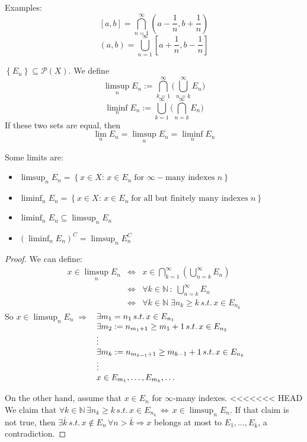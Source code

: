 Examples:
\[
    [a,b] = \bigcap_{n = 1}^{\infty} (a - \frac{1}{n}, b + \frac{1}{n}) 
\]
\[
    (a,b) = \bigcup_{n = 1}^{\infty}[a + \frac{1}{n}, b - \frac{1}{n}]
\]
\begin{definition}
    \(\left\lbrace E_n \right\rbrace \subseteq \mathcal{P}(X)\). We define 
    \[
        \limsup_{n} E_n := \bigcap_{k = 1}^{\infty} \bigl(\bigcup_{n = k}^{\infty} E_n\bigr)
    \]
    \[
        \liminf_{n} E_n := \bigcup_{k = 1}^{\infty} \bigl(\bigcap_{n = k}^{\infty} E_n\bigr)
    \]
    If these two sets are equal, then 
    \[
        \lim_n E_n = \limsup_n E_n = \liminf_n E_n
    \]
\end{definition}
\begin{proposition}
    Some limits are:
    \begin{itemize}
        \item \(\limsup_n E_n = \left\lbrace x \in X :\, x \in E_n \; \mbox{for }\infty-\mbox{many indexes }n \right\rbrace\)
        \item \(\liminf_n E_n = \left\lbrace x \in X :\, x \in E_n \; \mbox{for all but finitely many indexes }n \right\rbrace\)
        \item \(\liminf_n E_n \subseteq \limsup_n E_n\)
        \item \(\left( \liminf_n E_n\right)^C = \limsup_n E_n^C\) 
    \end{itemize}
\end{proposition}
\begin{proof}
    We can define:
    \[
    \begin{array}{ccc}
        x \in \limsup_n E_n & \Leftrightarrow & x \in \bigcap_{k = 1}^{\infty} \left(\bigcup_{n = k}^{\infty} E_n\right) \\
        & \Leftrightarrow & \forall k \in \mathbb{N} \, : \; \bigcup_{n = k}^{\infty} E_n \\
        & \Leftrightarrow &  \forall k \in \mathbb{N} \; \exists n_k \geq k \, s.t. \, x \in E_{n_k}
        
    \end{array}
\]
So \(x \in \limsup_n E_n \; \Rightarrow\) \(\begin{array}[t]{l}
    \exists m_1 = n_1 \, s.t. \, x \in E_{n_1} \\
    \exists m_2 := n_{m_1 + 1} \geq m_1 + 1 \, s.t. \, x \in E_{n_2} \\
    \vdots \\
    \exists m_k := n_{m_{k-1} + 1} \geq m_{k-1} + 1 \, s.t. \, x \in E_{n_k} \\
    \vdots \\
    x \in E_{m_1}, \ldots, E_{m_k}, \ldots 
\end{array}
\)

On the other hand, assume that \(x \in E_n\) for \(\infty\)-many indexes.
<<<<<<< HEAD
We claim that \(\forall k \in \mathbb{N} \, \exists n_k \geq k \, s.t. \, x \in E_{n_k} \, \Leftrightarrow \, x \in \limsup_n E_n\). 
If that claim is not true, then \(\exists \bar{k} \, s.t. \, x \not \in E_n \, \forall n > \bar{k} \Rightarrow x\) belongs at most to \(E_1, \ldots, E_{\bar{k}}\), a contradiction. 
\end{proof}

